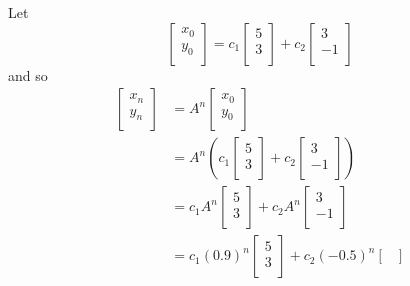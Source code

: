 \documentclass{article}
\begin{document}
\begin{example}
      Let \[
        \begin{bmatrix}
          x_0\\y_0\\
        \end{bmatrix} = c_1
        \begin{bmatrix}
          5\\3\\
        \end{bmatrix} + c_2
        \begin{bmatrix}
          3\\-1\\
        \end{bmatrix}
      \] and so
      \begin{align*}
        \begin{bmatrix}
          x_n\\y_n\\
        \end{bmatrix} &= A^n
        \begin{bmatrix}
          x_0\\y_0\\
        \end{bmatrix}\\
        &= A^n\left(c_1
          \begin{bmatrix}
            5\\3\\
          \end{bmatrix} + c_2
          \begin{bmatrix}
            3\\-1\\
        \end{bmatrix}\right)\\
        &= c_1A^n
        \begin{bmatrix}
          5\\3\\
        \end{bmatrix} + c_2A^n
        \begin{bmatrix}
          3\\-1\\
        \end{bmatrix}\\
        &= c_1(0.9)^n
        \begin{bmatrix}
          5\\3\\
        \end{bmatrix} + c_2(-0.5)^n
        \begin{bmatrix}

\end{bmatrix}
\end{align*}
\end{example}
\end{document}
